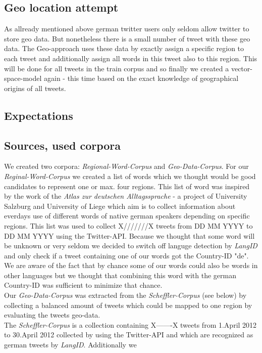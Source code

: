 \documentclass[../Main.tex]{subfiles}
\begin{document}
\subsection{Geo location attempt}
As allready mentioned above german twitter users only seldom allow twitter to store geo data. But nonetheless there is a small number of tweet with these geo data. The Geo-approach uses these data by exactly assign a specific region to each tweet and additionally assign all words in this tweet also to this region. This will be done for all tweets in the train corpus and so finally we created a vector-space-model again - this time based on the exact knowledge of geographical origins of all tweets. 
\subsection{Expectations}
\subsection{Sources, used corpora}
We created two corpora: \emph{Regional-Word-Corpus} and \emph{Geo-Data-Corpus}.
For our \emph{Reginal-Word-Corpus} we created a list of words which we thought would be good candidates to represent one or max. four regions. This list of word was inspired by the work of the \emph{Atlas zur deutschen Alltagssprache} - a project of University Salzburg and University of Liege which aim is to collect information about everdays use of different words of native german speakers depending on specific regions. This list was used to collect X///////X tweets from DD MM YYYY to DD MM YYYY using the Twitter-API. Because we thought that some word will be unknown or very seldom we decided to switch off languge detection by \emph{LangID} and only check if a tweet containing one of our words got the Country-ID "de". We are aware of the fact that by chance some of our words could also be words in other languages but we thought that combining this word with the german Country-ID was sufficient to minimize that chance.\\
Our \emph{Geo-Data-Corpus} was extracted from the \emph{Scheffler-Corpus} (see below) by collecting a balanced amount of tweets which could be mapped to one region by evaluating the tweets geo-data.\\
The \emph{Scheffler-Corpus} is a collection containing X-------X tweets from 1.April 2012 to 30.April 2012 collected by using the Twitter-API and which are recognized as german tweets by \emph{LangID}.
Additionally we 
\end{document}
